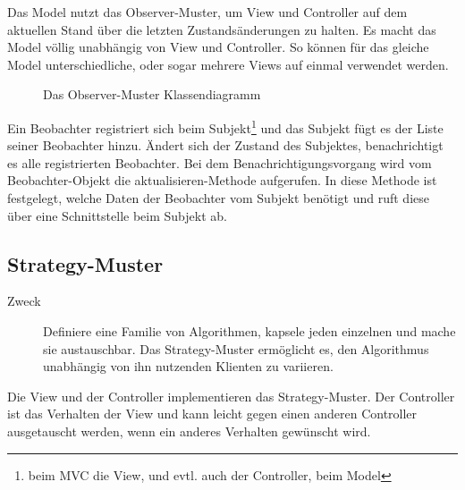 \documentclass[11pt,a4paper,titlepage]{scrreprt}
\begin{document}
Das Model nutzt das Observer-Muster, um View und Controller auf dem aktuellen
Stand über die letzten Zustandsänderungen zu halten.
Es macht das Model völlig unabhängig von View und Controller. So können für das gleiche
Model unterschiedliche, oder sogar mehrere Views auf einmal verwendet werden.

\begin{figure}[h]
\caption{Das Observer-Muster Klassendiagramm}
\end{figure}

Ein Beobachter registriert sich beim Subjekt\footnote{beim MVC die View, und evtl.
auch der Controller, beim Model} und das Subjekt fügt es der Liste seiner Beobachter
hinzu. Ändert sich der Zustand des Subjektes, benachrichtigt es alle registrierten
Beobachter. Bei dem Benachrichtigungsvorgang wird vom Beobachter-Objekt die
aktualisieren-Methode aufgerufen. In diese Methode ist festgelegt, welche Daten
der Beobachter vom Subjekt benötigt und ruft diese über eine Schnittstelle beim
Subjekt ab.

\subsection{Strategy-Muster}
\begin{description}
\item[Zweck]
Definiere eine Familie von Algorithmen, kapsele jeden einzelnen und mache sie austauschbar.
Das Strategy-Muster ermöglicht es, den Algorithmus unabhängig von ihn nutzenden Klienten
zu variieren. \citep[S. 373]{Riehle200407}

\end{description}

Die View und der Controller implementieren das Strategy-Muster. Der Controller ist das
Verhalten der View und kann leicht gegen einen anderen Controller ausgetauscht werden,
wenn ein anderes Verhalten gewünscht wird.
\end{document}
